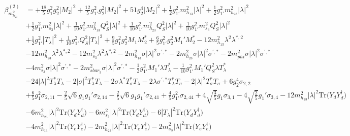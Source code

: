 {\begin{align}
\beta_{m_{h_{23}}^2}^{(2)} & =  
+\frac{18}{5} g_{1}^{2} g_{2}^{2} |M_2|^2 +\frac{12}{5} g_{1'}^{2} g_{2}^{2} |M_2|^2 +51 g_{2}^{4} |M_2|^2 +\frac{1}{2} g_{1'}^{2} m_{h_{13}}^2 |\lambda|^2 +\frac{1}{2} g_{1'}^{2} m_{h_{23}}^2 |\lambda|^2 \nonumber \\ 
 &+\frac{1}{2} g_{1'}^{2} m_{s_3}^2 |\lambda|^2 +\frac{1}{10} g_{1'}^{2} m_{h_{13}}^2 Q_{S}^{2} |\lambda|^2 +\frac{1}{10} g_{1'}^{2} m_{h_{23}}^2 Q_{S}^{2} |\lambda|^2 +\frac{1}{10} g_{1'}^{2} m_{s_3}^2 Q_{S}^{2} |\lambda|^2 \nonumber \\ 
 &+\frac{1}{2} g_{1'}^{2} |T_{\lambda}|^2 +\frac{1}{10} g_{1'}^{2} Q_{S}^{2} |T_{\lambda}|^2 +\frac{9}{5} g_{1}^{2} g_{2}^{2} M_1 M_2^* +\frac{6}{5} g_{1'}^{2} g_{2}^{2} M_1' M_2^* -12 m_{h_{13}}^2 \lambda^{2} \lambda^{*,2} \nonumber \\ 
 &-12 m_{h_{23}}^2 \lambda^{2} \lambda^{*,2} -12 m_{s_3}^2 \lambda^{2} \lambda^{*,2} -2 m_{h_{13}}^2 \sigma |\lambda|^2 \sigma^{\prime,*} -2 m_{h_{23}}^2 \sigma |\lambda|^2 \sigma^{\prime,*} -2 m_{phi}^2 \sigma |\lambda|^2 \sigma^{\prime,*} \nonumber \\ 
 &-4 m_{s_3}^2 \sigma |\lambda|^2 \sigma^{\prime,*} -2 m_{sbar_3}^2 \sigma |\lambda|^2 \sigma^{\prime,*} -\frac{1}{2} g_{1'}^{2} M_1' \lambda T_{\lambda}^* -\frac{1}{10} g_{1'}^{2} M_1' Q_{S}^{2} \lambda T_{\lambda}^* \nonumber \\ 
 &-24 |\lambda|^2 T_{\lambda}^* T_{\lambda} -2 |\sigma|^2 T_{\lambda}^* T_{\lambda} -2 \sigma \lambda^* T_{\sigma}^* T_{\lambda} -2 \lambda \sigma^{\prime,*} T_{\lambda}^* T_{\sigma} -2 |\lambda|^2 T_{\sigma}^* T_{\sigma} +6 g_{2}^{4} \sigma_{2,2} \nonumber \\ 
 &+\frac{6}{5} g_{1}^{2} \sigma_{2,11} -\frac{2}{5} \sqrt{6} g_1 g_1' \sigma_{2,14} -\frac{2}{5} \sqrt{6} g_1 g_1' \sigma_{2,41} +\frac{4}{5} g_{1'}^{2} \sigma_{2,44} +4 \sqrt{\frac{3}{5}} g_1 \sigma_{3,1} -4 \sqrt{\frac{2}{5}} g_1' \sigma_{3,4} -12 m_{h_{13}}^2 |\lambda|^2 \mbox{Tr}\Big({Y_d  Y_{d}^{\dagger}}\Big) \nonumber \\ 
 &-6 m_{h_{23}}^2 |\lambda|^2 \mbox{Tr}\Big({Y_d  Y_{d}^{\dagger}}\Big) -6 m_{s_3}^2 |\lambda|^2 \mbox{Tr}\Big({Y_d  Y_{d}^{\dagger}}\Big) -6 |T_{\lambda}|^2 \mbox{Tr}\Big({Y_d  Y_{d}^{\dagger}}\Big) \nonumber \\ 
 &-4 m_{h_{13}}^2 |\lambda|^2 \mbox{Tr}\Big({Y_e  Y_{e}^{\dagger}}\Big) -2 m_{h_{23}}^2 |\lambda|^2 \mbox{Tr}\Big({Y_e  Y_{e}^{\dagger}}\Big) -2 m_{s_3}^2 |\lambda|^2 \mbox{Tr}\Big({Y_e  Y_{e}^{\dagger}}\Big) \nonumber \\ 

\end{align}}
